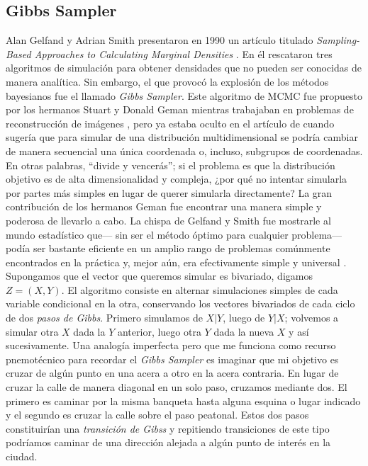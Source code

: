 \subsection{Gibbs Sampler}

Alan Gelfand y Adrian Smith presentaron en 1990 un artículo titulado \textit{Sampling-Based Approaches to Calculating Marginal Densities} \parencite{GelfandSmith90}. En él rescataron tres algoritmos de simulación para obtener densidades que no pueden ser conocidas de manera analítica. Sin embargo, el que provocó la explosión de los métodos bayesianos fue el llamado \textit{Gibbs Sampler}. Este algoritmo de MCMC fue propuesto por los hermanos Stuart y Donald Geman mientras trabajaban en problemas de reconstrucción de imágenes \parencite{GemanGeman84}, pero ya estaba oculto en el artículo de \textcite{Hastings70} cuando sugería que para simular de una distribución multidimensional se podría cambiar de manera secuencial una única coordenada o, incluso, subgrupos de coordenadas.\\ 

En otras palabras, ``divide y vencerás''; si el problema es que la distribución objetivo es de alta dimensionalidad y compleja, ¿por qué no intentar simularla por partes más simples en lugar de querer simularla directamente? La gran contribución de los hermanos Geman fue encontrar una manera simple y poderosa de llevarlo a cabo. La chispa de Gelfand y Smith fue mostrarle al mundo estadístico que--- sin ser el método óptimo para cualquier problema--- podía ser bastante eficiente en un amplio rango de problemas comúnmente encontrados en la práctica y, mejor aún, era efectivamente simple y universal \parencite{GelfandEtAl90}.\\

Supongamos que el vector que queremos simular es bivariado, digamos $Z = (X,Y)$. El algoritmo consiste en alternar simulaciones simples de cada variable condicional en la otra, conservando los vectores bivariados de cada ciclo de dos \textit{pasos de Gibbs}. Primero simulamos de $X|Y$, luego de $Y|X$; volvemos a simular otra $X$ dada la $Y$ anterior, luego otra $Y$ dada la nueva $X$ y así sucesivamente. Una analogía imperfecta pero que me funciona como recurso pnemotécnico para recordar el \textit{Gibbs Sampler} es imaginar que mi objetivo es cruzar de algún punto en una acera a otro en la acera contraria. En lugar de cruzar la calle de manera diagonal en un solo paso, cruzamos mediante dos. El primero es caminar por la misma banqueta hasta alguna esquina o lugar indicado y el segundo es cruzar la calle sobre el paso peatonal. Estos dos pasos constituirían una \textit{transición de Gibss} y repitiendo transiciones de este tipo podríamos caminar de una dirección alejada a algún punto de interés en la ciudad.\\ 

